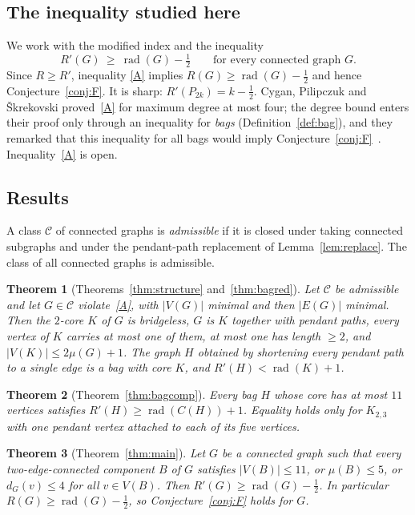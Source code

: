 \documentclass[11pt]{amsart}
\newtheorem{introthm}{Theorem}
\theoremstyle{definition}
\DeclareMathOperator{\rad}{rad}
\newcommand{\Rp}{R'}
\newcommand{\C}{\mathcal{C}}
\newcommand{\kmax}{11}
\newcommand{\mumax}{5}
\begin{document}
\subsection*{The inequality studied here}
We work with the modified index and the inequality
\begin{equation}\label{A}\tag{A}
\Rp(G)\ \ge\ \rad(G)-\tfrac12 \qquad\text{for every connected graph } G .
\end{equation}
Since $R\ge\Rp$, inequality \eqref{A} implies $R(G)\ge\rad(G)-\frac12$ and hence Conjecture~\ref{conj:F}.
It is sharp: $\Rp(P_{2k})=k-\tfrac12$. Cygan, Pilipczuk and \v{S}krekovski proved~\eqref{A} for maximum degree at
most four; the degree bound enters their proof only through an inequality for \emph{bags}
(Definition~\ref{def:bag}), and they remarked that this inequality for all bags would imply
Conjecture~\ref{conj:F}~\cite{CPS}. Inequality~\eqref{A} is open.

\subsection*{Results}
A class $\C$ of connected graphs is \emph{admissible} if it is closed under taking connected subgraphs and under the
pendant-path replacement of Lemma~\ref{lem:replace}. The class of all connected graphs is admissible.

\begin{introthm}[Theorems~\ref{thm:structure} and~\ref{thm:bagred}]\label{introA}
Let $\C$ be admissible and let $G\in\C$ violate~\eqref{A}, with $|V(G)|$ minimal and then $|E(G)|$ minimal.
Then the $2$-core $K$ of $G$ is bridgeless, $G$ is $K$ together with pendant paths, every vertex of $K$ carries at
most one of them, at most one has length $\ge2$, and $|V(K)|\le2\mu(G)+1$. The graph $H$ obtained by
shortening every pendant path to a single edge is a bag with core $K$, and $\Rp(H)<\rad(K)+1$.
\end{introthm}

\begin{introthm}[Theorem~\ref{thm:bagcomp}]\label{introB}
Every bag $H$ whose core has at most $\kmax$ vertices satisfies $\Rp(H)\ge\rad(C(H))+1$. Equality holds only for
$K_{2,3}$ with one pendant vertex attached to each of its five vertices.
\end{introthm}

\begin{introthm}[Theorem~\ref{thm:main}]\label{introC}
Let $G$ be a connected graph such that every two-edge-connected component $B$ of $G$ satisfies
$|V(B)|\le\kmax$, or $\mu(B)\le\mumax$, or $d_G(v)\le4$ for all $v\in V(B)$. Then $\Rp(G)\ge\rad(G)-\frac12$. In
particular $R(G)\ge\rad(G)-\frac12$, so Conjecture~\ref{conj:F} holds for $G$.
\end{introthm}
\end{document}

